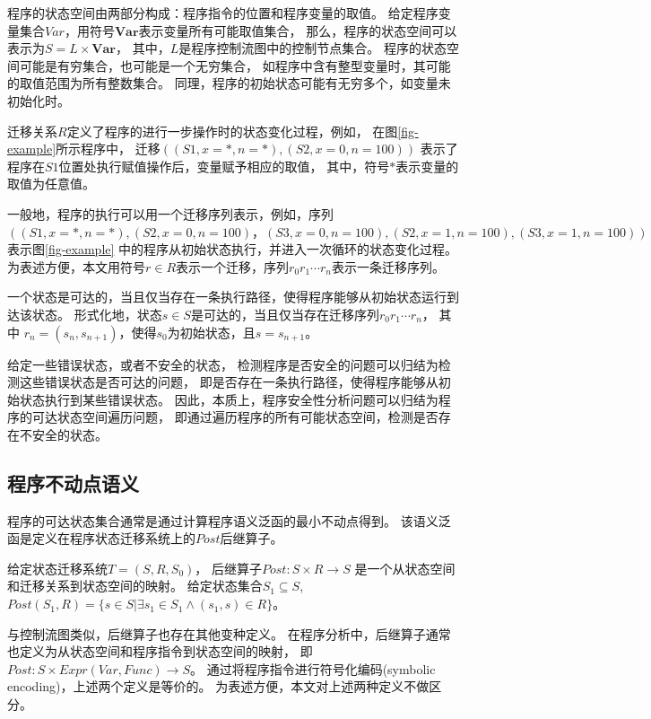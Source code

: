 程序的状态空间由两部分构成：程序指令的位置和程序变量的取值。
给定程序变量集合$Var$，用符号$\textbf{Var}$表示变量所有可能取值集合，
那么，程序的状态空间可以表示为$S = L \times \textbf{Var}$，
其中，$L$是程序控制流图中的控制节点集合。
程序的状态空间可能是有穷集合，也可能是一个无穷集合，
如程序中含有整型变量时，其可能的取值范围为所有整数集合。
同理，程序的初始状态可能有无穷多个，如变量未初始化时。

迁移关系$R$定义了程序的进行一步操作时的状态变化过程，例如，
在图\ref{fig-example}所示程序中，
迁移$((S1, x=*, n=*), (S2, x=0, n=100))$
表示了程序在$S1$位置处执行赋值操作后，变量赋予相应的取值，
其中，符号$*$表示变量的取值为任意值。

一般地，程序的执行可以用一个迁移序列表示，例如，序列
$((S1, x=*, n=*), (S2, x=0, n=100)，
(S3, x=0, n=100), (S2, x=1, n=100),
(S3, x=1, n=100) )$表示图\ref{fig-example}
中的程序从初始状态执行，并进入一次循环的状态变化过程。
为表述方便，本文用符号$r\in R$表示一个迁移，序列$r_0 r_1 \cdots r_n$表示一条迁移序列。

一个状态是可达的，当且仅当存在一条执行路径，使得程序能够从初始状态运行到达该状态。
形式化地，状态$s\in S$是可达的，当且仅当存在迁移序列$r_0 r_1 \cdots r_n$，
其中 $r_n = (s_n, s_{n+1})$，使得$s_0$为初始状态，且$s = s_{n+1}$。

给定一些错误状态，或者不安全的状态，
检测程序是否安全的问题可以归结为检测这些错误状态是否可达的问题，
即是否存在一条执行路径，使得程序能够从初始状态执行到某些错误状态。
因此，本质上，程序安全性分析问题可以归结为程序的可达状态空间遍历问题，
即通过遍历程序的所有可能状态空间，检测是否存在不安全的状态。


\subsection{程序不动点语义}

程序的可达状态集合通常是通过计算程序语义泛函的最小不动点得到。
该语义泛函是定义在程序状态迁移系统上的$Post$后继算子。


\begin{definition}
给定状态迁移系统$T=(S,R,S_0)$，
后继算子$Post: S \times R \rightarrow S$
是一个从状态空间和迁移关系到状态空间的映射。
给定状态集合$S_1 \subseteq S$,
$Post(S_1, R) = \{ s\in S | \exists s_1 \in S_1 \wedge (s_1, s)\in R \}$。
\end{definition}

与控制流图类似，后继算子也存在其他变种定义。
在程序分析中，后继算子通常也定义为从状态空间和程序指令到状态空间的映射，
即$Post: S \times Expr(Var, Func) \rightarrow S$。
通过将程序指令进行符号化编码(symbolic encoding)，上述两个定义是等价的。
为表述方便，本文对上述两种定义不做区分。

